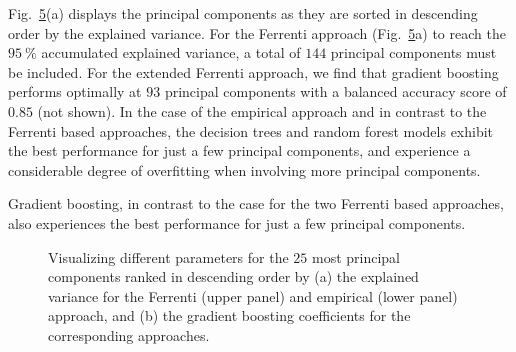 \documentclass[superscriptaddress,unsortedaddress,
 amsmath,amssymb,
 aps,
]{revtex4-2}
\begin{document}
Fig.~\ref{fig:PComponents}(a) displays the principal components as they are sorted in descending order by the explained variance. For the Ferrenti approach (Fig.~\ref{fig:PComponents}a) to reach the $95 \ \%$ accumulated explained variance, a total of $144$ principal components must be included. For the extended Ferrenti approach, we find that gradient boosting performs optimally at $93$ principal components with a balanced accuracy score of $0.85$ (not shown). In the case of the empirical approach and in contrast to the Ferrenti based approaches, the decision trees and random forest models exhibit the best performance for just a few principal components, and experience a considerable degree of overfitting 
when involving more principal components. 

Gradient boosting, in contrast to the case for the two Ferrenti based approaches, also experiences the best performance for just a few principal components. 
\begin{figure}[ht]
    \centering
    \begin{subfigure}[b]{0.45\textwidth}
        
        \label{fig:01-fi-e}
    \end{subfigure}
    \begin{subfigure}[b]{0.45\textwidth}
        
        \label{fig:01-fi-d}
    \end{subfigure}%
    \hfill
    \begin{subfigure}[b]{0.45\textwidth}
        
        \label{fig:03-fi-e}
        \subcaption{}
    \end{subfigure}
    \begin{subfigure}[b]{0.45\textwidth}
        
        \label{fig:03-fi-d}
        \subcaption{}
    \end{subfigure}
    \caption{Visualizing different parameters for the $25$ most principal components ranked in descending order by (a) the explained variance for the Ferrenti (upper panel) and empirical (lower panel) approach, and (b) the gradient boosting coefficients for the corresponding approaches. 
    }
    \label{fig:PComponents}
\end{figure}
\end{document}
